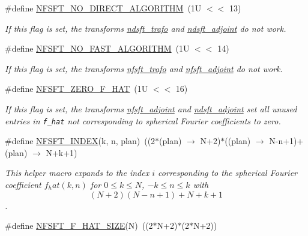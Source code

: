 \begin{CompactItemize}
\#define \hyperlink{group__nfsft_g9ed987164acf6e362ab2878506fbca95}{NFSFT\_\-NO\_\-DIRECT\_\-ALGORITHM}~(1U $<$$<$ 13)
\begin{CompactList}\small\item\em If this flag is set, the transforms \hyperlink{group__nfsft_gc1bcdf551a0bf1b4a5890b87e583caf8}{ndsft\_\-trafo} and \hyperlink{group__nfsft_g88c7be3ead1c726a1d5b8b903952c527}{ndsft\_\-adjoint} do not work. \item\end{CompactList}\item 
\#define \hyperlink{group__nfsft_ga228bbed7ddbbb4a15f1cd11ec27b415}{NFSFT\_\-NO\_\-FAST\_\-ALGORITHM}~(1U $<$$<$ 14)
\begin{CompactList}\small\item\em If this flag is set, the transforms \hyperlink{group__nfsft_g5796fc68c432d46dfcab7abd8c56ee22}{nfsft\_\-trafo} and \hyperlink{group__nfsft_g813bb48d404c7286310733c99a81a169}{nfsft\_\-adjoint} do not work. \item\end{CompactList}\item 
\#define \hyperlink{group__nfsft_g7797dfe75149e88ee680fc2579c31505}{NFSFT\_\-ZERO\_\-F\_\-HAT}~(1U $<$$<$ 16)
\begin{CompactList}\small\item\em If this flag is set, the transforms \hyperlink{group__nfsft_g813bb48d404c7286310733c99a81a169}{nfsft\_\-adjoint} and \hyperlink{group__nfsft_g88c7be3ead1c726a1d5b8b903952c527}{ndsft\_\-adjoint} set all unused entries in {\tt f\_\-hat} not corresponding to spherical Fourier coefficients to zero. \item\end{CompactList}\item 
\hypertarget{group__nfsft_g8be22087991e0a82cfa59a3f0f2a5e86}{
\#define \hyperlink{group__nfsft_g8be22087991e0a82cfa59a3f0f2a5e86}{NFSFT\_\-INDEX}(k, n, plan)~((2$\ast$(plan) $\rightarrow$ N+2)$\ast$((plan) $\rightarrow$ N-n+1)+(plan) $\rightarrow$ N+k+1)}
\label{group__nfsft_g8be22087991e0a82cfa59a3f0f2a5e86}

\begin{CompactList}\small\item\em This helper macro expands to the index $i$ corresponding to the spherical Fourier coefficient $f_hat(k,n)$ for $0 \le k \le N$, $-k \le n \le k$ with \[ (N+2)(N-n+1)+N+k+1 \]. \item\end{CompactList}\item 
\hypertarget{group__nfsft_gd426bf64ff72d6e3c2450fbb56146a44}{
\#define \hyperlink{group__nfsft_gd426bf64ff72d6e3c2450fbb56146a44}{NFSFT\_\-F\_\-HAT\_\-SIZE}(N)~((2$\ast$N+2)$\ast$(2$\ast$N+2))}
\label{group__nfsft_gd426bf64ff72d6e3c2450fbb56146a44}


\end{CompactItemize}
